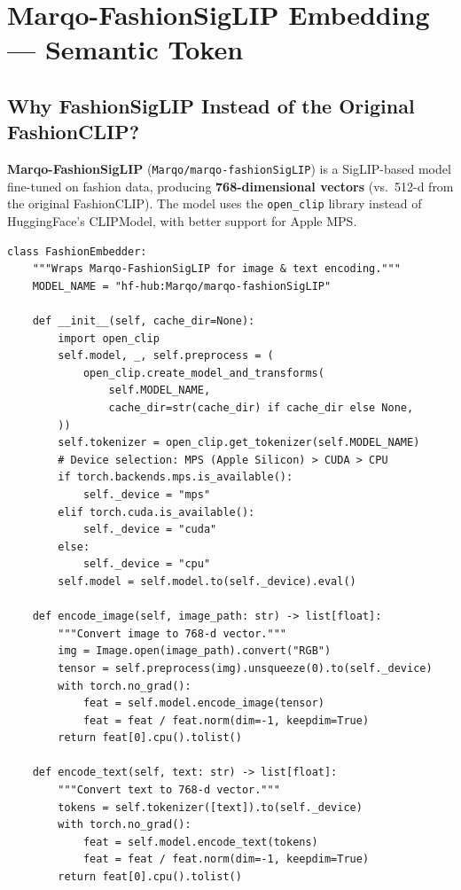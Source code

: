 \documentclass[12pt, twoside]{report}
\begin{document}
\section{Marqo-FashionSigLIP Embedding --- Semantic Token}

\subsection{Why FashionSigLIP Instead of the Original FashionCLIP?}
\textbf{Marqo-FashionSigLIP} (\texttt{Marqo/marqo-fashionSigLIP}) is a SigLIP-based model fine-tuned on fashion data, producing \textbf{768-dimensional vectors} (vs.\ 512-d from the original FashionCLIP). The model uses the \texttt{open\_clip} library instead of HuggingFace's CLIPModel, with better support for Apple MPS.

\begin{lstlisting}[caption={FashionEmbedder class --- indexing/build\_index.py}]
class FashionEmbedder:
    """Wraps Marqo-FashionSigLIP for image & text encoding."""
    MODEL_NAME = "hf-hub:Marqo/marqo-fashionSigLIP"

    def __init__(self, cache_dir=None):
        import open_clip
        self.model, _, self.preprocess = (
            open_clip.create_model_and_transforms(
                self.MODEL_NAME,
                cache_dir=str(cache_dir) if cache_dir else None,
        ))
        self.tokenizer = open_clip.get_tokenizer(self.MODEL_NAME)
        # Device selection: MPS (Apple Silicon) > CUDA > CPU
        if torch.backends.mps.is_available():
            self._device = "mps"
        elif torch.cuda.is_available():
            self._device = "cuda"
        else:
            self._device = "cpu"
        self.model = self.model.to(self._device).eval()

    def encode_image(self, image_path: str) -> list[float]:
        """Convert image to 768-d vector."""
        img = Image.open(image_path).convert("RGB")
        tensor = self.preprocess(img).unsqueeze(0).to(self._device)
        with torch.no_grad():
            feat = self.model.encode_image(tensor)
            feat = feat / feat.norm(dim=-1, keepdim=True)
        return feat[0].cpu().tolist()

    def encode_text(self, text: str) -> list[float]:
        """Convert text to 768-d vector."""
        tokens = self.tokenizer([text]).to(self._device)
        with torch.no_grad():
            feat = self.model.encode_text(tokens)
            feat = feat / feat.norm(dim=-1, keepdim=True)
        return feat[0].cpu().tolist()
\end{lstlisting}
\end{document}
